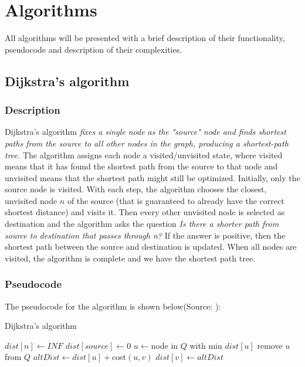\documentclass[runningheads]{llncs}
\begin{document}
\section{Algorithms}
All algorithms will be presented with a brief description of their functionality, pseudocode and description of their complexities.

\subsection{Dijkstra's algorithm}
\subsubsection{Description}
Dijkstra's algorithm \textit{fixes a single node as the "source" node and finds shortest paths from the source to all other nodes in the graph, producing a shortest-path tree.}\cite{ref_url_Dj} The algorithm assigns each node a visited/unvisited state, where visited means that it has found the shortest path from the source to that node and unvisited means that the shortest path might still be optimized. Initially, only the source node is visited. With each step, the algorithm chooses the closest, unvisited node $n$ of the source (that is guaranteed to already have the correct shortest distance) and visits it. Then every other unvisited node is selected as destination and the algorithm asks the question \emph{Is there a shorter path from source to destination that passes through n?} If the answer is positive, then the shortest path between the source and destination is updated. When all nodes are visited, the algorithm is complete and we have the shortest path tree.

\subsubsection{Pseudocode}
The pseudocode for the algorithm is shown below(Source: \cite{ref_url_Dj}):

\begin{algorithm}
\caption{Dijkstra's algorithm}\label{algD:cap}
\begin{algorithmic}[1]
	\State $dist[n] \gets INF$
\EndFor
\State $dist[source] \gets 0$
	\State $u \gets $node in $Q$ with min $dist[u]$
	\State remove $u$ from $Q$
		\State $altDist \gets dist[u] + $cost$(u, v)$
			\State $dist[v] \gets altDist$
		\EndIf
	\EndFor
\EndWhile
\end{algorithmic}
\end{algorithm}
\end{document}
